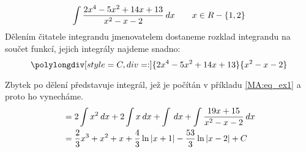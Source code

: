   \small\begin{example}
    \begin{equation}\label{mai:int_ex_02}
      \int{\frac{2x^4-5x^2+14x+13}{x^2-x-2}\hspace{2pt}dx} \qquad x\in R - \{1,2\}
    \end{equation}
    Dělením čitatele integrandu jmenovatelem dostaneme rozklad integrandu na součet funkcí, jejich 
    integrály najdeme snadno:
    \tiny\begin{equation*}
      \polylongdiv[style=C,div=:]{2x^4-5x^2+14x+13}{x^2-x-2}
    \end{equation*}\small

    Zbytek po dělení představuje integrál, jež je počítán v příkladu \ref{MA:eq_ex1} a proto ho 
    vynecháme. 
    \begin{align*}
       &= 2\int x^2\hspace{2pt}dx + 2\int x\hspace{2pt}dx + \int\hspace{2pt}dx + \int\frac{19x+15}{x^2-x-2}\hspace{2pt}dx     \\
       &= \frac{2}{3}x^3 + x^2 + x + \frac{4}{3}\ln|x+1| - \frac{53}{3}\ln|x-2| + C 
    \end{align*}                
  \end{example}